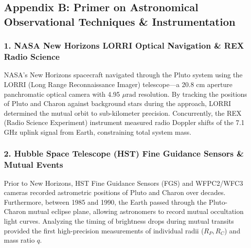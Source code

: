 \documentclass[11pt,a4paper]{article}
\begin{document}
\subsection*{Appendix B: Primer on Astronomical Observational Techniques \& Instrumentation}

\subsubsection*{1. NASA New Horizons LORRI Optical Navigation \& REX Radio Science}
NASA's New Horizons spacecraft navigated through the Pluto system using the LORRI (Long Range Reconnaissance Imager) telescope—a 20.8 cm aperture panchromatic optical camera with 4.95 $\mu\text{rad}$ resolution. By tracking the positions of Pluto and Charon against background stars during the approach, LORRI determined the mutual orbit to sub-kilometer precision. Concurrently, the REX (Radio Science Experiment) instrument measured radio Doppler shifts of the 7.1 GHz uplink signal from Earth, constraining total system mass.

\subsubsection*{2. Hubble Space Telescope (HST) Fine Guidance Sensors \& Mutual Events}
Prior to New Horizons, HST Fine Guidance Sensors (FGS) and WFPC2/WFC3 cameras recorded astrometric positions of Pluto and Charon over decades. Furthermore, between 1985 and 1990, the Earth passed through the Pluto-Charon mutual eclipse plane, allowing astronomers to record mutual occultation light curves. Analyzing the timing of brightness drops during mutual transits provided the first high-precision measurements of individual radii ($R_P, R_C$) and mass ratio $q$.
\end{document}
